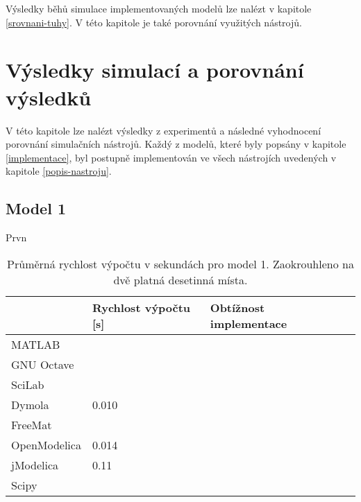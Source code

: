 Výsledky běhů simulace implementovaných modelů lze nalézt v kapitole \ref{srovnani-tuhy}. V této kapitole je také porovnání využitých nástrojů.

\chapter{Výsledky simulací a porovnání výsledků}
\label{kapitola5}
V této kapitole lze nalézt výsledky z experimentů a následné vyhodnocení porovnání simulačních nástrojů. Každý z modelů, které byly popsány v kapitole \ref{implementace}, byl postupně implementován ve všech nástrojích uvedených v kapitole \ref{popis-nastroju}. 

\section{Model 1}
\label{srovnani-micek}
Prvn


\begin{table}[ht]
\centering
\begin{tabular}{|l|l|l|l|}
\hline
             & Rychlost výpočtu {[}s{]} & Obtížnost implementace &  \\ \hline
MATLAB       &                          &  &  \\ \hline
GNU Octave   &                          &  &  \\ \hline
SciLab       &                          &  &  \\ \hline
Dymola       &         0.010                 &  &  \\ \hline
FreeMat &                          &  &  \\ \hline
OpenModelica    &       0.014                   &  &  \\ \hline
jModelica        &     0.11                     &  &  \\ \hline
Scipy           &                          &  &  \\ \hline
\end{tabular}
\caption{Průměrná rychlost výpočtu v sekundách pro model 1. Zaokrouhleno na dvě platná desetinná místa.}
\label{tab:micek-tabulka}
\end{table}

